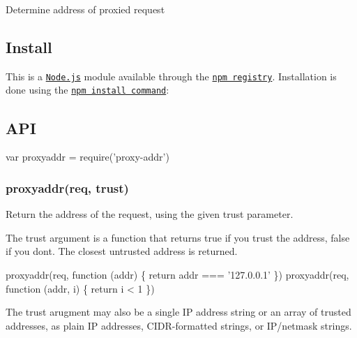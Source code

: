 \href{https://npmjs.org/package/proxy-addr}{\tt } \href{https://npmjs.org/package/proxy-addr}{\tt } \href{https://nodejs.org/en/download/}{\tt } \href{https://travis-ci.org/jshttp/proxy-addr}{\tt } \href{https://coveralls.io/r/jshttp/proxy-addr?branch=master}{\tt }

Determine address of proxied request

\subsection*{Install}

This is a \href{https://nodejs.org/en/}{\tt Node.\+js} module available through the \href{https://www.npmjs.com/}{\tt npm registry}. Installation is done using the \href{https://docs.npmjs.com/getting-started/installing-npm-packages-locally}{\tt {\ttfamily npm install} command}\+:




\subsection*{A\+PI}


\begin{DoxyCode}
var proxyaddr = require('proxy-addr')
\end{DoxyCode}


\subsubsection*{proxyaddr(req, trust)}

Return the address of the request, using the given {\ttfamily trust} parameter.

The {\ttfamily trust} argument is a function that returns {\ttfamily true} if you trust the address, {\ttfamily false} if you don\textquotesingle{}t. The closest untrusted address is returned.


\begin{DoxyCode}
proxyaddr(req, function (addr) \{ return addr === '127.0.0.1' \})
proxyaddr(req, function (addr, i) \{ return i < 1 \})
\end{DoxyCode}


The {\ttfamily trust} arugment may also be a single IP address string or an array of trusted addresses, as plain IP addresses, C\+I\+D\+R-\/formatted strings, or I\+P/netmask strings.


